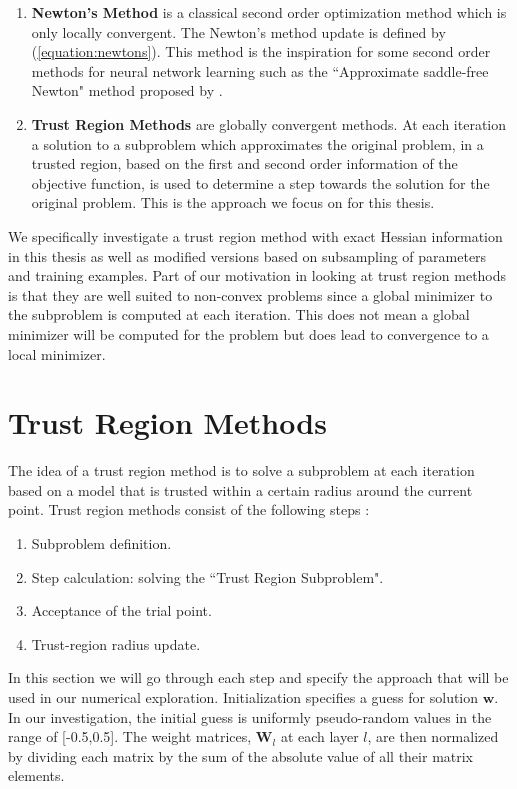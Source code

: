 \documentclass[letterpaper,12pt,titlepage,oneside,final]{book}
\begin{document}
	\begin{enumerate}
		\item{\textbf{Newton's Method} is a classical second order optimization method which is only locally convergent. The Newton's method update is defined by (\ref{equation:newtons}). This method is the inspiration for some  second order methods for neural network learning such as the ``Approximate saddle-free Newton" method proposed by \cite{saddle_free}.}
		\item{\textbf{Trust Region Methods} are globally convergent methods. At each iteration a solution to a subproblem which approximates the original problem, in a trusted region, based on the first and second order information of the objective function, is used to determine a step towards the solution for the original problem. This is the approach we focus on for this thesis. }
	\end{enumerate}
	We specifically investigate a trust region method with exact Hessian information in this thesis as well as modified versions based on subsampling of parameters and training examples. Part of our motivation in looking at trust region methods is that they are well suited to non-convex problems since a global minimizer to the subproblem is computed at each iteration. This does not mean a global minimizer will be computed for the problem but does lead to convergence to a local minimizer. 
	
	\section{Trust Region Methods}
	The idea of a trust region method is to solve a subproblem at each iteration based on a model that is trusted within a certain radius around the current point. Trust region methods consist of the following steps \cite{TRM.book}:
	\begin{enumerate}
		\item {Subproblem definition.} \label{model def}
		\item {Step calculation: solving the ``Trust Region Subproblem".} \label{step calc}
		\item {Acceptance of the trial point.} \label{accept step}
		\item {Trust-region radius update.} \label{update radius}
	\end{enumerate}
	In this section we will go through each step and specify the approach that will be used in our numerical exploration. Initialization specifies a guess for solution $\mathbf{w}$. In our investigation, the initial guess is uniformly pseudo-random values in the range of [-0.5,0.5]. The weight matrices, $\mathbf{W}_{l}$ at each layer $l$, are then normalized by dividing each matrix by the sum of the absolute value of all their matrix elements. 
	
\end{document}
